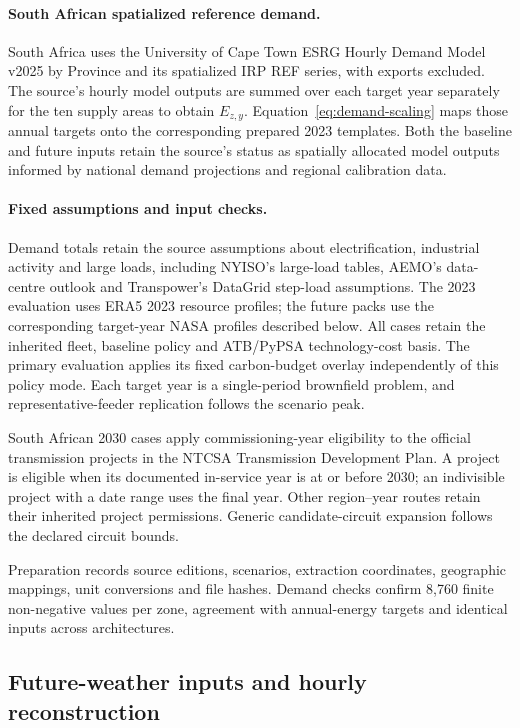 \documentclass[pdflatex,sn-nature]{sn-jnl}
\begin{document}
\paragraph{South African spatialized reference demand.}
South Africa uses the University of Cape Town ESRG Hourly Demand Model v2025 by Province and its spatialized IRP REF series, with exports excluded. The source's hourly model outputs are summed over each target year separately for the ten supply areas to obtain $E_{z,y}$. Equation~\ref{eq:demand-scaling} maps those annual targets onto the corresponding prepared 2023 templates. Both the baseline and future inputs retain the source's status as spatially allocated model outputs informed by national demand projections and regional calibration data.

\paragraph{Fixed assumptions and input checks.}
Demand totals retain the source assumptions about electrification, industrial activity and large loads, including NYISO's large-load tables, AEMO's data-centre outlook and Transpower's DataGrid step-load assumptions. The 2023 evaluation uses ERA5 2023 resource profiles; the future packs use the corresponding target-year NASA profiles described below. All cases retain the inherited fleet, baseline policy and ATB/PyPSA technology-cost basis\cite{nrel2024atb,pypsatechdata}. The primary evaluation applies its fixed carbon-budget overlay independently of this policy mode. Each target year is a single-period brownfield problem, and representative-feeder replication follows the scenario peak.

South African 2030 cases apply commissioning-year eligibility to the official transmission projects in the NTCSA Transmission Development Plan. A project is eligible when its documented in-service year is at or before 2030; an indivisible project with a date range uses the final year. Other region--year routes retain their inherited project permissions. Generic candidate-circuit expansion follows the declared circuit bounds.

Preparation records source editions, scenarios, extraction coordinates, geographic mappings, unit conversions and file hashes. Demand checks confirm 8,760 finite non-negative values per zone, agreement with annual-energy targets and identical inputs across architectures.

\subsection{Future-weather inputs and hourly reconstruction}\label{sec:future-weather}
\end{document}
